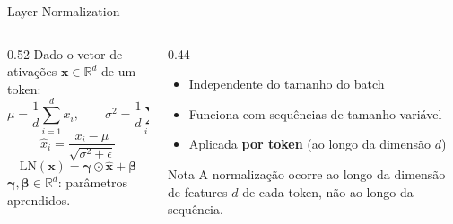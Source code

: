 \documentclass[aspectratio=169, xcolor=dvipsnames]{beamer}
\begin{document}
  \begin{frame}{Layer Normalization \cite{ba2016layernorm}}
    \begin{columns}[T]
      \begin{column}{0.52\textwidth}
        Dado o vetor de ativações $\mathbf{x} \in \mathbb{R}^d$ de um token:
        \[
          \mu = \frac{1}{d}\sum_{i=1}^d x_i, \qquad
          \sigma^2 = \frac{1}{d}\sum_{i=1}^d (x_i - \mu)^2
        \]
        \[
          \hat{x}_i = \frac{x_i - \mu}{\sqrt{\sigma^2 + \epsilon}}
        \]
        \[
          \text{LN}(\mathbf{x}) = \boldsymbol{\gamma} \odot \hat{\mathbf{x}} + \boldsymbol{\beta}
        \]
        $\boldsymbol{\gamma}, \boldsymbol{\beta} \in \mathbb{R}^d$: parâmetros aprendidos.
      \end{column}
      \begin{column}{0.44\textwidth}
        \begin{itemize}
          \item Independente do tamanho do batch
          \item Funciona com sequências de tamanho variável
          \item Aplicada \textbf{por token} (ao longo da dimensão $d$)
        \end{itemize}
        \vspace{0.3em}
        \begin{exampleblock}{Nota}
          A normalização ocorre ao longo da dimensão de features $d$ de cada token, não ao longo da sequência.
        \end{exampleblock}
      \end{column}
    \end{columns}
  \end{frame}
\end{document}

